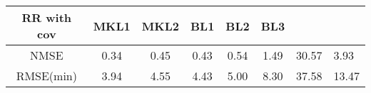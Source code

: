\begin{tabular}{ccccccc}
	\hline
	RR with cov & MKL1 & MKL2 & BL1 & BL2 & BL3\\
	\hline
	NMSE	 & 0.34 & 0.45 & 0.43 & 0.54 & 1.49 & 30.57 & 3.93\\
	RMSE(min)	 & 3.94 & 4.55 & 4.43 & 5.00 & 8.30 & 37.58 & 13.47\\
	\hline
\end{tabular}